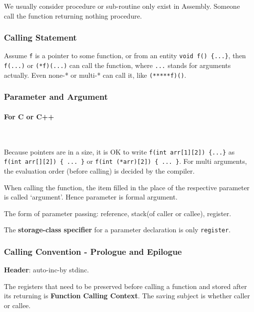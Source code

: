 We usually consider procedure or sub-routine only exist in Assembly. Someone call the function returning nothing procedure.



\subsubsection{Calling Statement}

Assume \verb|f| is a pointer to some function, or from an entity \verb|void f() {...}|, then \verb|f(...)| or \verb|(*f)(...)| can call the function, where \verb|...| stands for arguments actually. Even none-* or multi-* can call it, like \verb|(*****f)()|.



\subsubsection{Parameter and Argument}



\paragraph{For C or C++} \

Because pointers are in a size, it is OK to write \verb|f(int arr[1][2]) {...}| as \verb|f(int arr[][2]) { ... }| or \verb|f(int (*arr)[2]) { ... }|. For multi arguments, the evaluation order (before calling) is decided by the compiler.

When calling the function, the item filled in the place of the respective parameter is called `argument'. Hence parameter is formal argument.

The form of parameter passing: reference, stack(of caller or callee), register.

The \textbf{storage-class specifier} for a parameter declaration is only \verb|register|.



\subsubsection{Calling Convention - Prologue and Epilogue}

\textbf{Header}: auto-inc-by stdinc.

The registers that need to be preserved before calling a function and stored after its returning is \textbf{Function Calling Context}. The saving subject is whether caller or callee.

